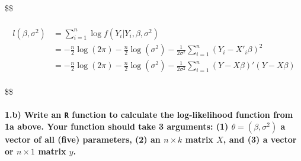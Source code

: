 \documentclass[
  letterpaper,
  DIV=11,
  numbers=noendperiod]{scrartcl}
\let\oldparagraph\paragraph
\renewcommand{\paragraph}[1]{\oldparagraph{#1}\mbox{}}
\begin{document}
\$\$

\begin{align}
& \\l(\beta, \sigma^2) 
&= \sum_{i=1}^{n} \log f(Y_i | Y_i, \beta, \sigma^2) \\
&= -\frac{n}{2} \log(2\pi) - \frac{n}{2} \log(\sigma^2) -\frac{1}{2\sigma^2} \sum_{i=1}^{n} (Y_i - X'_i \beta)^2 \\
&= -\frac{n}{2} \log(2\pi) - \frac{n}{2} \log(\sigma^2) -\frac{1}{2\sigma^2} \sum_{i=1}^{n} (Y - X\beta)'(Y - X\beta) \\
\end{align}

\$\$

\hypertarget{b-write-an-r-function-to-calculate-the-log-likelihood-function-from-1a-above.-your-function-should-take-3-arguments-1-theta-beta-sigma2-a-vector-of-all-five-parameters-2-an-n-times-k-matrix-x-and-3-a-vector-or-n-times-1-matrix-y.}{%
\paragraph{\texorpdfstring{1.b) Write an \texttt{R} function to
calculate the log-likelihood function from 1a above. Your function
should take 3 arguments: (1) \(\theta = (\beta, \sigma^2)\) a vector of
all (five) parameters, (2) an \(n \times k\) matrix \(X\), and (3) a
vector or \(n \times 1\) matrix
\(y\).}{1.b) Write an R function to calculate the log-likelihood function from 1a above. Your function should take 3 arguments: (1) \textbackslash theta = (\textbackslash beta, \textbackslash sigma\^{}2) a vector of all (five) parameters, (2) an n \textbackslash times k matrix X, and (3) a vector or n \textbackslash times 1 matrix y.}}\label{b-write-an-r-function-to-calculate-the-log-likelihood-function-from-1a-above.-your-function-should-take-3-arguments-1-theta-beta-sigma2-a-vector-of-all-five-parameters-2-an-n-times-k-matrix-x-and-3-a-vector-or-n-times-1-matrix-y.}}
\end{document}
